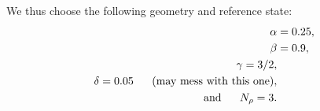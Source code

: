 \documentclass[12pt]{article}
\numberwithin{equation}{section}
\begin{document}
We thus choose the following geometry and reference state:
\begin{subequations}
	\begin{align}
		\alpha &= 0.25,\\
		\beta &= 0.9,\\
		\gamma = 3/2,\\
		\delta = 0.05\ \ \ \ \  \text{(may mess with this one)},\\
		\text{and}\ \ \ \ \  N_\rho = 3.
	\end{align}
\end{subequations}
\clearpage
\newpage
	
	
\end{document}
